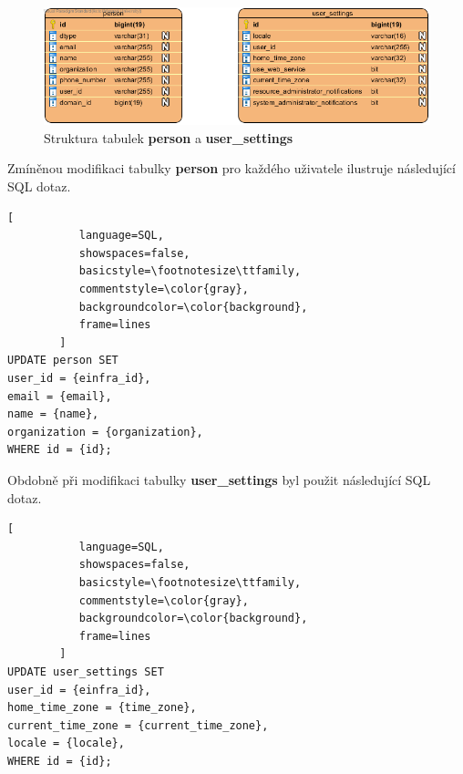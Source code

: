 \documentclass[
  printed, %
  twoside, %
  table,   %
  nolof,     %
  nolot,     %
]{fithesis3}
\begin{document}
\begin{figure}[H]
\label{fig:erd-person-user-settings}
\caption{Struktura tabulek \textbf{person} a \textbf{user\_settings}}
\centering
\includegraphics[width=12.8cm]{pics/erd-person-user_settings} 
\end{figure}
\par 

Zmíněnou modifikaci tabulky \textbf{person} pro každého uživatele ilustruje následující SQL dotaz.

\begin{lstlisting}[
           language=SQL,
           showspaces=false,
           basicstyle=\footnotesize\ttfamily,
           commentstyle=\color{gray},
           backgroundcolor=\color{background},
           frame=lines
        ]
UPDATE person SET 
user_id = {einfra_id},
email = {email},
name = {name},
organization = {organization},
WHERE id = {id};
\end{lstlisting}

Obdobně při modifikaci tabulky \textbf{user\_settings} byl použit následující SQL dotaz. 

\begin{lstlisting}[
           language=SQL,
           showspaces=false,
           basicstyle=\footnotesize\ttfamily,
           commentstyle=\color{gray},
           backgroundcolor=\color{background},
           frame=lines
        ]
UPDATE user_settings SET 
user_id = {einfra_id},
home_time_zone = {time_zone},
current_time_zone = {current_time_zone},
locale = {locale},
WHERE id = {id};
\end{lstlisting}
\end{document}
